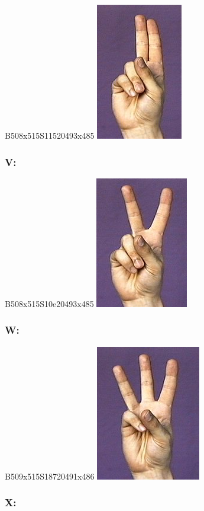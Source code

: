 \documentclass{article}
\begin{document}
B508x515S11520493x485
\includegraphics[scale=0.5]{images/u.jpg}

\subsubsection{V:}

B508x515S10e20493x485
\includegraphics[scale=0.5]{images/v.jpg}

\subsubsection{W:}

B509x515S18720491x486
\includegraphics[scale=0.5]{images/w.jpg}

\subsubsection{X:}
\end{document}

